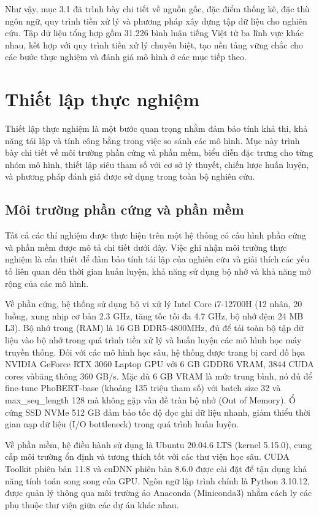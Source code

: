 \documentclass[14pt, a4paper]{report}
\begin{document}
Như vậy, mục 3.1 đã trình bày chi tiết về nguồn gốc, đặc điểm thống kê, đặc thù ngôn ngữ, quy trình tiền xử lý và phương pháp xây dựng tập dữ liệu cho nghiên cứu. Tập dữ liệu tổng hợp gồm 31.226 bình luận tiếng Việt từ ba lĩnh vực khác nhau, kết hợp với quy trình tiền xử lý chuyên biệt, tạo nền tảng vững chắc cho các bước thực nghiệm và đánh giá mô hình ở các mục tiếp theo.


\section{Thiết lập thực nghiệm}


Thiết lập thực nghiệm là một bước quan trọng nhằm đảm bảo tính khả thi, khả năng tái lập và tính công bằng trong việc so sánh các mô hình. Mục này trình bày chi tiết về môi trường phần cứng và phần mềm, biểu diễn đặc trưng cho từng nhóm mô hình, thiết lập siêu tham số với cơ sở lý thuyết, chiến lược huấn luyện, và phương pháp đánh giá được sử dụng trong toàn bộ nghiên cứu.


\subsection{Môi trường phần cứng và phần mềm}


Tất cả các thí nghiệm được thực hiện trên một hệ thống có cấu hình phần cứng và phần mềm được mô tả chi tiết dưới đây. Việc ghi nhận môi trường thực nghiệm là cần thiết để đảm bảo tính tái lập của nghiên cứu và giải thích các yếu tố liên quan đến thời gian huấn luyện, khả năng sử dụng bộ nhớ và khả năng mở rộng của các mô hình.


Về phần cứng, hệ thống sử dụng bộ vi xử lý Intel Core i7-12700H (12 nhân, 20 luồng, xung nhịp cơ bản 2.3 GHz, tăng tốc tối đa 4.7 GHz, bộ nhớ đệm 24 MB L3). Bộ nhớ trong (RAM) là 16 GB DDR5-4800MHz, đủ để tải toàn bộ tập dữ liệu vào bộ nhớ trong quá trình tiền xử lý và huấn luyện các mô hình học máy truyền thống. Đối với các mô hình học sâu, hệ thống được trang bị card đồ họa NVIDIA GeForce RTX 3060 Laptop GPU với 6 GB GDDR6 VRAM, 3844 CUDA cores vàbăng thông 360 GB/s. Mặc dù 6 GB VRAM là mức trung bình, nó đủ để fine-tune PhoBERT-base (khoảng 135 triệu tham số) với batch size 32 và max\_seq\_length 128 mà không gặp vấn đề tràn bộ nhớ (Out of Memory). Ổ cứng SSD NVMe 512 GB đảm bảo tốc độ đọc ghi dữ liệu nhanh, giảm thiểu thời gian nạp dữ liệu (I/O bottleneck) trong quá trình huấn luyện.


Về phần mềm, hệ điều hành sử dụng là Ubuntu 20.04.6 LTS (kernel 5.15.0), cung cấp môi trường ổn định và tương thích tốt với các thư viện học sâu. CUDA Toolkit phiên bản 11.8 và cuDNN phiên bản 8.6.0 được cài đặt để tận dụng khả năng tính toán song song của GPU. Ngôn ngữ lập trình chính là Python 3.10.12, được quản lý thông qua môi trường ảo Anaconda (Miniconda3) nhằm cách ly các phụ thuộc thư viện giữa các dự án khác nhau.
\end{document}
